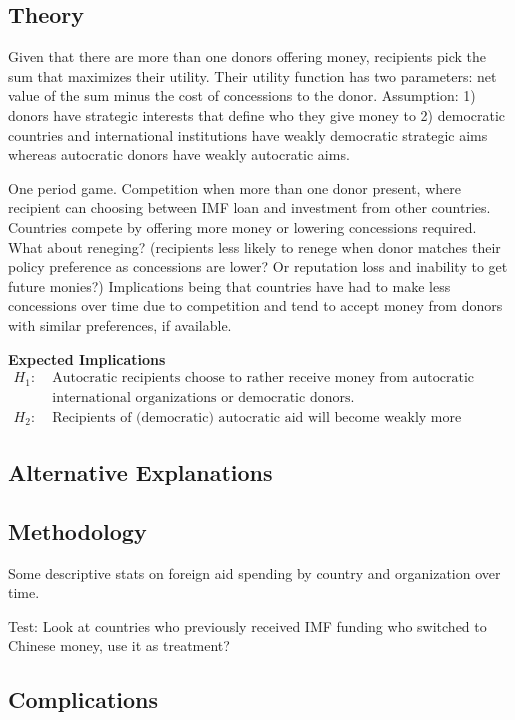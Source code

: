 \subsection*{Theory} 
Given that there are more than one donors offering money, recipients pick the sum that maximizes their utility. Their utility function has two parameters: net value of the sum minus the cost of concessions to the donor. Assumption: 1) donors have strategic interests that define who they give money to 2) democratic countries and international institutions have weakly democratic strategic aims whereas autocratic donors have weakly autocratic aims. 

One period game. Competition when more than one donor present, where recipient can choosing between IMF loan and investment from other countries. Countries compete by offering more money or lowering concessions required. What about reneging? (recipients less likely to renege when donor matches their policy preference as concessions are lower? Or reputation loss and inability to get future monies?)  Implications being that countries have had to make less concessions over time due to competition and tend to accept money from donors with similar preferences, if available.

\textbf{Expected Implications} 
\begin{align*}
    H_1:\; &\text{Autocratic recipients choose to rather receive money from autocratic donors than}\\
    &\text{international organizations or democratic donors.}\\
    H_2:\; &\text{Recipients of (democratic) autocratic aid will become weakly more (democratic) autocratic.}
\end{align*}

\subsection*{Alternative Explanations}

\subsection*{Methodology}
Some descriptive stats on foreign aid spending by country and organization over time. 

Test: Look at countries who previously received IMF funding who switched to Chinese money, use it as treatment?

\subsection*{Complications}
